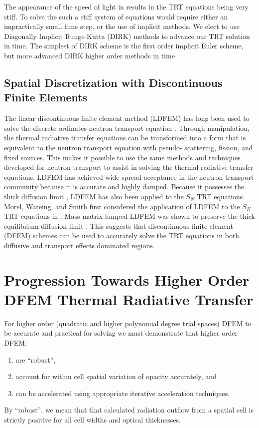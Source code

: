 The appearance of the speed of light in  results in the TRT equations being very stiff.
To solve the such a stiff system of equations would require either an impractically small time step, or the use of implicit methods.
We elect to use Diagonally Implicit Runge-Kutta (DIRK) methods to advance our TRT solution in time.
The simplest of DIRK scheme is the first order implicit Euler scheme, but more advanced DIRK higher order methods in time \cite{alexander}.

\subsection{Spatial Discretization with Discontinuous Finite Elements}

The linear discontinuous finite element method (LDFEM) has long been used to solve the discrete ordinates neutron transport equation \cite{reed}.
Through manipulation, the thermal radiative transfer equations can be transformed  into a form that is equivalent to the neutron transport equation with pseudo- scattering, fission, and fixed sources.
This makes it possible to use the same methods and techniques developed for neutron transport to assist in solving the  thermal radiative transfer equations.
LDFEM has achieved wide spread acceptance in the neutron transport community because it is accurate \cite{larsen_nelson} and highly damped.  
Because it possesses the thick diffusion limit \cite{larsen_morel_asymptotics}, LDFEM has also been applied to the $S_N$ TRT equations.  
Morel, Wareing, and Smith first considered the application of LDFEM to the $S_N$ TRT equations in \cite{morel_radtran}.
Mass matrix lumped LDFEM was shown to preserve the thick equilibrium diffusion limit \cite{morel_radtran}.  
This suggests that discontinuous finite element (DFEM) schemes can be used to accurately solve the TRT equations in both diffusive and transport effects dominated regions.

\section{Progression Towards Higher Order DFEM Thermal Radiative Transfer}

For higher order (quadratic and higher polynomial degree trial spaces) DFEM to be accurate and practical for solving  we must demonstrate that higher order DFEM:
\begin{enumerate}
\item are ``robust'',
\item account for within cell spatial variation of opacity accurately, and
\item can be accelerated using appropriate iterative acceleration techniques.
\end{enumerate}
By ``robust'', we mean that that calculated radiation outflow from a spatial cell is strictly positive for all cell widths and optical thicknesses.

